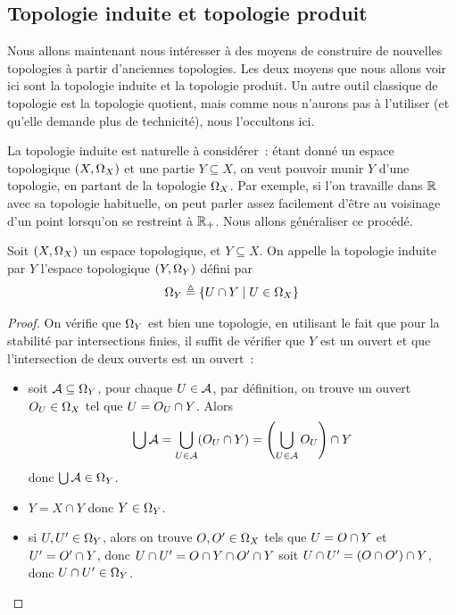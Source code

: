 \subsection{Topologie induite et topologie produit}

Nous allons maintenant nous intéresser à des moyens de construire de nouvelles
topologies à partir d'anciennes topologies. Les deux moyens que nous allons
voir ici sont la topologie induite et la topologie produit. Un autre outil
classique de topologie est la topologie quotient, mais comme nous n'aurons pas à
l'utiliser (et qu'elle demande plus de technicité), nous l'occultons ici.

La topologie induite est naturelle à considérer~: étant donné un espace
topologique $(X,\Omega_{X})$ et une partie $Y\subseteq X$, on veut pouvoir munir
$Y$ d'une topologie, en partant de la topologie $\Omega_{X}$. Par exemple, si
l'on travaille dans $\mathbb R$ avec sa topologie habituelle, on peut parler assez
facilement d'être au voisinage d'un point lorsqu'on se restreint à
$\mathbb R_+$. Nous allons généraliser ce procédé.

\begin{definition}
  Soit $(X,\Omega_{X})$ un espace topologique, et $Y\subseteq X$. On appelle la
  topologie induite par $Y$ l'espace topologique $(Y,\Omega_{Y})$ défini par
  \[\Omega_{Y} \triangleq \left\{ U \cap Y \;\middle\vert\; U \in \Omega_{X} \right\}\]
\end{definition}

\begin{proof}
  On vérifie que $\Omega_{Y}$ est bien une topologie, en utilisant le fait que
  pour la stabilité par intersections finies, il suffit de vérifier que $Y$ est
  un ouvert et que l'intersection de deux ouverts est un ouvert~:
  \begin{itemize}
  \item soit $\mathcal A\subseteq \Omega_{Y}$, pour chaque $U\in \mathcal A$,
    par définition, on trouve un ouvert
    $O_{U}\in \Omega_{X}$ tel que $U = O_{U} \cap Y$.
    Alors
    \[\bigcup \mathcal A = \bigcup_{U\in \mathcal A} (O_{U}\cap Y) =
    \left(\bigcup_{U\in \mathcal A} O_{U}\right)\cap Y\]
    donc $\bigcup \mathcal A \in \Omega_{Y}$.
  \item $Y = X \cap Y$ donc $Y\in \Omega_{Y}$.
  \item si $U,U'\in\Omega_{Y}$, alors on trouve
    $O,O'\in\Omega_{X}$ tels que
    $U = O\cap Y$ et $U' = O'\cap Y$, donc
    $U\cap U' = O\cap Y \cap O'\cap Y$
    soit $U\cap U' = (O\cap O')\cap Y$, donc
    $U\cap U' \in \Omega_{Y}$.\qedhere
  \end{itemize}
\end{proof}

